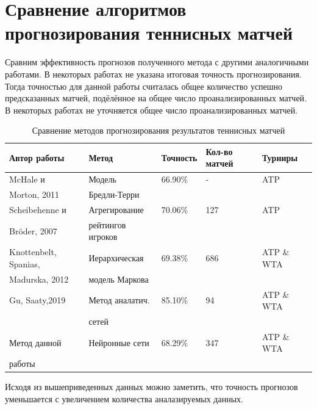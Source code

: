 \section{Сравнение алгоритмов прогнозирования теннисных матчей}
Сравним эффективность прогнозов полученного метода с другими аналогичными работами.
В некоторых работах не указана итоговая точность прогнозирования. Тогда точностью для данной работы считалась общее количество успешно предсказанных матчей, подёлённое на общее число проанализированных матчей\cite{Book40}. В некоторых работах не уточняется общее число проанализированных матчей.
\begin{table}[!h]
	
	\caption{\label{tab:issled1}Сравнение методов прогнозирования результатов теннисных матчей}
	
	\begin{center}
		
		\begin{tabular}{|l|l|l|l|l|}
			
			\hline
			
			Автор работы& Метод & Точность & Кол-во матчей& Турниры  \\
			
			\hline 
			
			McHale и & Модель& 66.90\% & - & ATP  \\
		    Morton, 2011  \cite{Book18} & Бредли-Терри& & &  \\
			\hline
			Scheibehenne и  & Агрегирование  & 70.06\% & 127 & ATP  \\
			Bröder,
			2007\cite{Book40} &рейтингов игроков&&& \\
			\hline
			Knottenbelt, Spanias,& Иерархическая & 69.38\% & 686& ATP \& WTA 	\\		Madurska, 2012\cite{Book41} & модель Маркова& && \\
			\hline
			Gu, Saaty,2019\cite{Book42} &Метод аналатич.& 85.10\%&94&ATP \& WTA\\
			  &сетей&&&\\
			\hline
			Метод данной &Нейронные сети& 68.29\%&347&ATP \& WTA\\
			работы &&&&\\
			\hline
		\end{tabular}
		
	\end{center}
	
\end{table}
Исходя из вышеприведенных данных можно заметить, что точность прогнозов уменьшается с увеличением количества аналазируемых данных.

